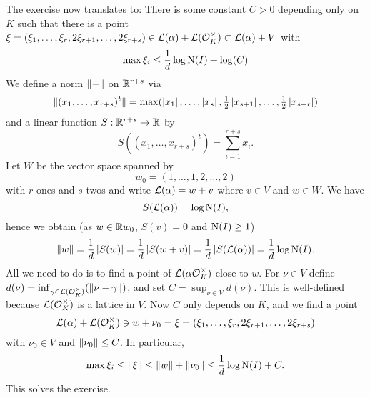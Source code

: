 \documentclass[a4paper,11pt]{article}
\begin{document}
\begin{enumerate}[wide, labelindent=0pt]
        The exercise now translates to: There is some constant $C > 0$ depending only
        on $K$ such that there is a point $\xi = (\xi_1, \dots, \xi_r, 2\xi_{r+1}, \dots,
        2\xi_{r+s}) \in \mathcal{L}(\alpha) + \mathcal{L}(\mathcal{O}_K^\times) \subset \mathcal{L}(\alpha)+V$ with 
        \begin{equation*}
             \max \xi_i \leq \frac 1d \log \operatorname{N}(I) + \log(C)
        \end{equation*}
        We define a norm $\lVert-\rVert$ on $\mathbb{R}^{r+s}$ via 
        \begin{equation*}
            \lVert(x_1, \dots, x_{r+s})^t \rVert = \max (\left\lvert x_1 \right\rvert, \dots, \left\lvert x_s \right\rvert,
            \tfrac 12 \left\lvert x_{s+1} \right\rvert, \dots, \tfrac 12 \left\lvert x_{s+r} \right\rvert)
        \end{equation*}
        and a linear function $S: \mathbb{R}^{r+s} \to \mathbb{R}$
        by
        \begin{equation*}
            S((x_1,\dots, x_{r+s})^t) = \sum_{i=1}^{r+s} x_i.
        \end{equation*}
        Let $W$ be the vector space spanned by 
        \begin{equation*}
            w_0 =  (1,\dots,1,2, \dots, 2)
        \end{equation*}
        with $r$ ones and $s$ twos and 
        write $\mathcal{L}(\alpha) = w + v$ where $v \in V$ and $w \in W$. We have 
        \begin{equation*}
            S(\mathcal{L}(\alpha)) = \log \operatorname{N}(I),
        \end{equation*}
        hence we obtain (as $w \in \mathbb{R} w_0$, $S(v) = 0$ and $\operatorname{N}(I) \geq 1$)
        $$\lVert w\rVert = \frac 1{d} \left\lvert S(w) \right\rvert 
        = \frac 1d \left\lvert S(w+v) \right\rvert = \frac 1d \left\lvert S(\mathcal{L}(\alpha)) \right\rvert = \frac 1d \log \operatorname{N}(I).$$
        All we need to do is to find a point of $\mathcal{L}(\alpha \mathcal{O}_K^\times)$
        close to $w$. For $\nu \in V$ define $d(\nu) = \inf_{\gamma \in \mathcal{L}(\mathcal{O}_K^\times)}
        (\lVert\nu-\gamma\rVert)$, and set $C = \sup_{\nu \in V} d(\nu)$. This 
        is well-defined because $\mathcal{L}(\mathcal{O}_K^\times)$ is a lattice in $V$.
        Now $C$ only depends on $K$, and we find a point 
        $$\mathcal{L}(\alpha) + \mathcal{L}(\mathcal{O}_K^\times) \ni w + \nu_0 = \xi = (\xi_1,\dots, \xi_r,
        2\xi_{r+1},\dots, 2\xi_{r+s})$$
        with $\nu_0 \in V$ and $\lVert\nu_0\rVert \leq C$. In particular,
        \begin{equation*}
        \max \xi_i \leq \lVert\xi\rVert \leq \lVert w\rVert + \lVert\nu_0\rVert \leq
        \frac 1d \log \operatorname{N}(I) + C.
        \end{equation*}
        This solves the exercise.
        

\end{enumerate}
\end{document}
